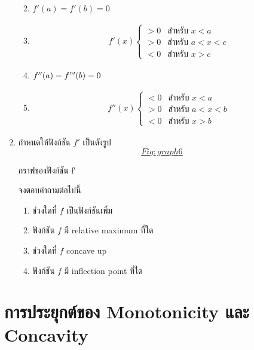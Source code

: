 \documentclass[
]{book}
\theoremstyle{definition}
\theoremstyle{definition}
\theoremstyle{definition}
\theoremstyle{definition}
\theoremstyle{remark}
\begin{document}
\begin{enumerate}
  \begin{enumerate}
  \def\labelenumii{\arabic{enumii}.}
  \item
    \(f'(a) = f'(b) = 0\)
  \item
    \begin{equation}   \begin{aligned}
        f'(x)  \begin{cases}
        > 0 &\text{สำหรับ $x<a$} \\
        > 0 &\text{สำหรับ $a<x<c$} \\
        < 0 &\text{สำหรับ $x>c$}
        \end{cases}
      \end{aligned} \end{equation}
  \item
    \(f''(a) = f"'(b) = 0\)
  \item
    \begin{equation}   \begin{aligned}
        f''(x) \begin{cases}
        < 0 &\text{สำหรับ $x<a$} \\
        > 0 &\text{สำหรับ $a<x<b$} \\
        < 0 &\text{สำหรับ $x>b$}
        \end{cases}
      \end{aligned} \end{equation}
  \end{enumerate}
\item
  กำหนดให้ฟังก์ชัน \(f'\)
  เป็นดังรูป~\hyperref[Fig:graph6]{\[Fig:graph6\]}

  กราฟของฟังก์ชัน {f′}

  จงตอบคำถามต่อไปนี้

  \begin{enumerate}
  \def\labelenumii{\arabic{enumii}.}
  \item
    ช่วงใดที่ \(f\) เป็นฟังก์ชันเพิ่ม
  \item
    ฟังก์ชัน \(f\) มี relative maximum ที่ใด
  \item
    ช่วงใดที่ \(f\) concave up
  \item
    ฟังก์ชัน \(f\) มี inflection point ที่ใด
  \end{enumerate}
\end{enumerate}

\section{การประยุกต์ของ Monotonicity และ Concavity}\label{uxe01uxe32uxe23uxe1buxe23uxe30uxe22uxe01uxe15uxe02uxe2duxe07-monotonicity-uxe41uxe25uxe30-concavity}
\end{document}
